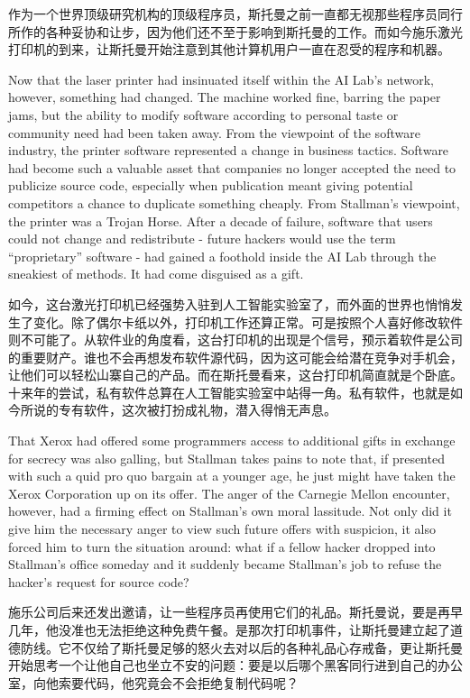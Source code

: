 \ifdefined\chs
作为一个世界顶级研究机构的顶级程序员，斯托曼之前一直都无视那些程序员同行所作的各种妥协和让步，因为他们还不至于影响到斯托曼的工作。而如今施乐激光打印机的到来，让斯托曼开始注意到其他计算机用户一直在忍受的程序和机器。
\fi

\ifdefined\eng
Now that the laser printer had insinuated itself within the AI Lab's network, however, something had changed. The machine worked fine, barring the paper jams, but the ability to modify software according to personal taste or community need had been taken away. From the viewpoint of the software industry, the printer software represented a change in business tactics. Software had become such a valuable asset that companies no longer accepted the need to publicize source code, especially when publication meant giving potential competitors a chance to duplicate something cheaply. From Stallman's viewpoint, the printer was a Trojan Horse. After a decade of failure, software that users could not change and redistribute - future hackers would use the term ``proprietary'' software - had gained a foothold inside the AI Lab through the sneakiest of methods. It had come disguised as a gift.
\fi

\ifdefined\chs
如今，这台激光打印机已经强势入驻到人工智能实验室了，而外面的世界也悄悄发生了变化。除了偶尔卡纸以外，打印机工作还算正常。可是按照个人喜好修改软件则不可能了。从软件业的角度看，这台打印机的出现是个信号，预示着软件是公司的重要财产。谁也不会再想发布软件源代码，因为这可能会给潜在竞争对手机会，让他们可以轻松山寨自己的产品。而在斯托曼看来，这台打印机简直就是个卧底。十来年的尝试，私有软件总算在人工智能实验室中站得一角。私有软件，也就是如今所说的专有软件，这次被打扮成礼物，潜入得悄无声息。
\fi

\ifdefined\eng
That Xerox had offered some programmers access to additional gifts in exchange for secrecy was also galling, but Stallman takes pains to note that, if presented with such a quid pro quo bargain at a younger age, he just might have taken the Xerox Corporation up on its offer. The anger of the Carnegie Mellon encounter, however, had a firming effect on Stallman's own moral lassitude. Not only did it give him the necessary anger to view such future offers with suspicion, it also forced him to turn the situation around: what if a fellow hacker dropped into Stallman's office someday and it suddenly became Stallman's job to refuse the hacker's request for source code?
\fi

\ifdefined\chs
施乐公司后来还发出邀请，让一些程序员再使用它们的礼品。斯托曼说，要是再早几年，他没准也无法拒绝这种免费午餐。是那次打印机事件，让斯托曼建立起了道德防线。它不仅给了斯托曼足够的怒火去对以后的各种礼品心存戒备，更让斯托曼开始思考一个让他自己也坐立不安的问题：要是以后哪个黑客同行进到自己的办公室，向他索要代码，他究竟会不会拒绝复制代码呢？ 
\fi
\fi

